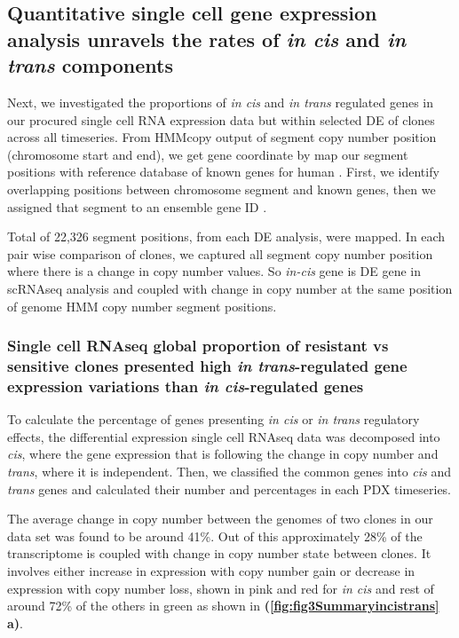 \subsection{Quantitative single cell gene expression analysis unravels the rates of \textit{ in cis} and \textit{in trans} components}
Next, we investigated the proportions of \textit{in cis} and \textit{in trans} regulated genes in our procured single cell RNA expression data but within selected \ac{DE} of clones across all timeseries. From HMMcopy output of segment copy number position (chromosome start and end), we get gene coordinate by map our segment positions with reference database of known genes for human  \cite{carlson2015txdb}. First, we identify overlapping positions between chromosome segment and known genes, then we assigned that segment to an ensemble gene ID \cite{rainer2019ensembldb}.

Total of 22,326 segment positions, from each DE analysis, were mapped. In each pair wise comparison of clones, we captured all segment copy number position where there is a change in copy number values. So \textit{in-cis} gene is DE gene in scRNAseq analysis and coupled with change in copy number at the same position of genome HMM copy number segment positions.

\subsubsection{Single cell RNAseq global proportion of resistant vs sensitive clones presented high \textit{in trans}-regulated gene expression variations than \textit{in cis}-regulated genes} 

To calculate the percentage of genes presenting \textit{in cis} or \textit{in trans} regulatory effects, the differential expression single cell RNAseq data was decomposed into \textit{cis}, where the gene expression that is following the change in copy number and \textit{trans}, where it is independent. Then, we classified the common genes into  \textit{cis}  and \textit{trans} genes and calculated their number and percentages in each PDX timeseries. 

The average change in copy number between the genomes of two clones in our data set was found to be around 41\%. Out of this approximately 28\% of the transcriptome is coupled with change in copy number state between clones. It involves either increase in expression with copy number gain or decrease in expression with copy number loss, shown in pink and red for \textit{in cis} and rest of  around 72\% of the others in green as shown in  \textbf{(\autoref{fig:fig3Summaryincistrans} a)}.

